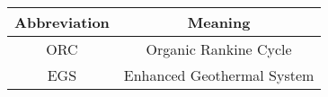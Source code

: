 \begin{table}[ht]
    \centering
    \begin{tabular}{c|c}
        Abbreviation & Meaning \\
        \hline
        ORC & Organic Rankine Cycle \\
        EGS & Enhanced Geothermal System 
    \end{tabular}
\end{table}
